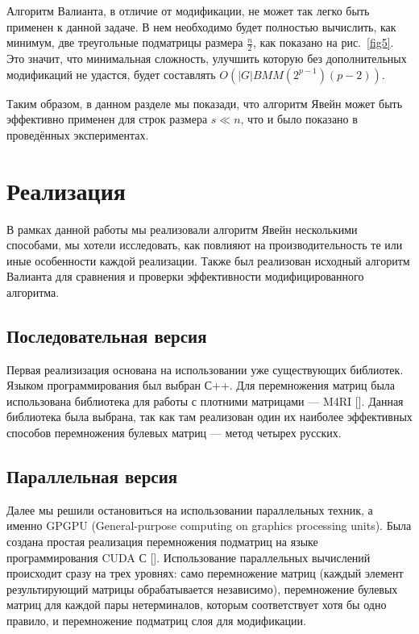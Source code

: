 \documentclass[14pt]{matmex-diploma-custom}
\begin{document}
Алгоритм Валианта, в отличие от модификации, не может так легко быть применен к данной задаче. В нем необходимо будет полностью вычислить, как минимум, две треугольные подматрицы размера $\frac{n}{2}$, как показано на рис.~\ref{fig5}.
Это значит, что минимальная сложность, улучшить которую без дополнительных модификаций не удастся, будет составлять $O(|G|BMM(2^{p - 1})(p - 2))$.

Таким образом, в данном разделе мы показади, что алгоритм Явейн может быть эффективно применен для строк размера $s \ll n$, что и было показано в проведённых экспериментах.



\section{Реализация}

В рамках данной работы мы реализовали алгоритм Явейн несколькими способами, мы хотели исследовать, как повлияют на производительность те или иные особенности каждой реализации. Также был реализован исходный алгоритм Валианта для сравнения и проверки эффективности модифицированного алгоритма.

\subsection{Последовательная версия}

Первая реализизация основана на использовании уже существующих библиотек. 
Языком программирования был выбран С++. Для перемножения матриц была использована библиотека для работы с плотними матрицами --- M4RI []. 
Данная библиотека была выбрана, так как там реализован один их наиболее эффективных способов перемножения булевых матриц --- метод четырех русских.  

\subsection{Параллельная версия}

Далее мы решили остановиться на использовании параллельных техник, а именно GPGPU (General-purpose computing on graphics processing units). Была создана простая реализация перемножения подматриц на языке программирования CUDA С []. Использование параллельных вычислений происходит сразу на трех уровнях: само перемножение матриц (каждый элемент результирующий матрицы обрабатывается независимо), перемножение булевых матриц для каждой пары нетерминалов, которым соответствует хотя бы одно правило, и перемножение подматриц слоя для модификации. 
\end{document}
